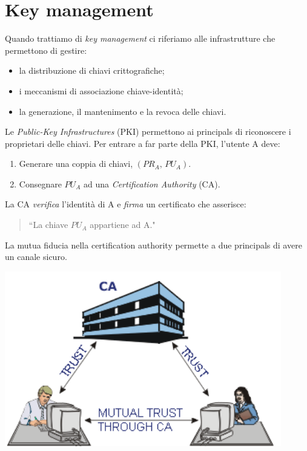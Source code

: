 \documentclass[a4paper, 11pt, notitlepage, fleqn]{report}
\begin{document}
\chapter{Key management}
Quando trattiamo di \emph{key management} ci riferiamo alle infrastrutture che permettono di gestire:
\begin{itemize}
	\item la distribuzione di chiavi crittografiche;
	\item i meccanismi di associazione chiave-identità;
	\item la generazione, il mantenimento e la revoca delle chiavi.
\end{itemize}
Le \emph{Public-Key Infrastructures} (PKI) permettono ai principals di riconoscere i proprietari delle chiavi. Per entrare a far parte della PKI, l'utente A deve:
\begin{enumerate}
	\item Generare una coppia di chiavi, $(PR_A,\,PU_A)$.
	\item Consegnare $PU_A$ ad una \emph{Certification Authority} (CA).
\end{enumerate}
La CA \emph{verifica} l'identità di A e \emph{firma} un certificato che asserisce:
\begin{quote}
	``La chiave $PU_A$ appartiene ad A."
\end{quote}
\begin{minipage}{.62\textwidth}
	\noindent La mutua fiducia nella certification authority permette a due principals di avere un canale sicuro.
\end{minipage}
\begin{minipage}{.38\textwidth}
	\centering
	\includegraphics[width=.9\textwidth]{images/CAMutualTrust}
\end{minipage}
\end{document}
